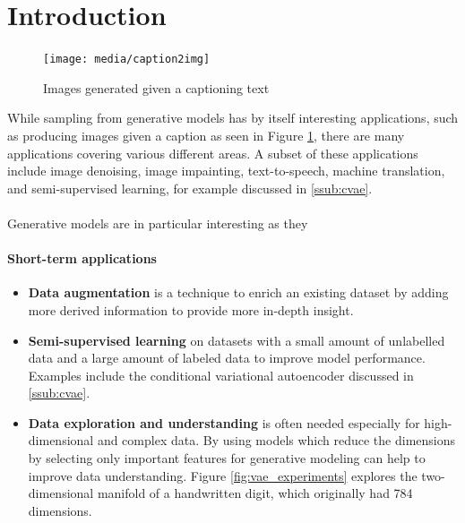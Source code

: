 \section{Introduction}
\label{sec:introduction}

\begin{figure}[h]
  \texttt{[image: media/caption2img]}
  \caption[Caption to Image]{Images generated given a captioning text \cite{gan_t2i:2016}}
  \label{fig:caption2img}
\end{figure}
While sampling from generative models has by itself interesting applications, such as producing images given a caption as seen in Figure \ref{fig:caption2img}, there are many applications covering various different areas.
A subset of these applications include
image denoising, %
image impainting, %
text-to-speech, %
machine translation, %
and semi-supervised learning, for example discussed in \ref{ssub:cvae}.
\\\\



Generative models are in particular interesting as they 



\paragraph{Short-term applications}
\begin{itemize}
  \item \textbf{Data augmentation} is a technique to enrich an existing dataset by adding more derived information to provide more in-depth insight.
  \item \textbf{Semi-supervised learning} on datasets with a small amount of unlabelled data and a large amount of labeled data to improve model performance. Examples include the conditional variational autoencoder discussed in \ref{ssub:cvae}.
  \item \textbf{Data exploration and understanding} is often needed especially for high-dimensional and complex data. By using models which reduce the dimensions by selecting only important features for generative modeling can help to improve data understanding. Figure \ref{fig:vae_experiments} explores the two-dimensional manifold of a handwritten digit, which originally had 784 dimensions.
\end{itemize}

